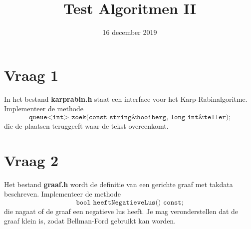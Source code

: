 \documentclass{article}
\begin{document}
\title{Test Algoritmen II}
\date{16 december 2019}
\author{}
\maketitle

\section{Vraag 1}
    In het bestand \textbf{karprabin.h} staat een interface voor het Karp-Rabinalgoritme. Implementeer de methode
    $$\texttt{queue<int> zoek(const string\& hooiberg, long int\& teller);}$$
    die de plaatsen teruggeeft waar de tekst overeenkomt.
    
\section{Vraag 2}
    Het bestand \textbf{graaf.h} wordt de definitie van een gerichte graaf met takdata beschreven. Implementeer de methode
    $$\texttt{bool heeftNegatieveLus() const;}$$
    die nagaat of de graaf een negatieve lus heeft. Je mag veronderstellen dat de graaf klein is, zodat Bellman-Ford gebruikt kan worden. 
	
    
\end{document}
